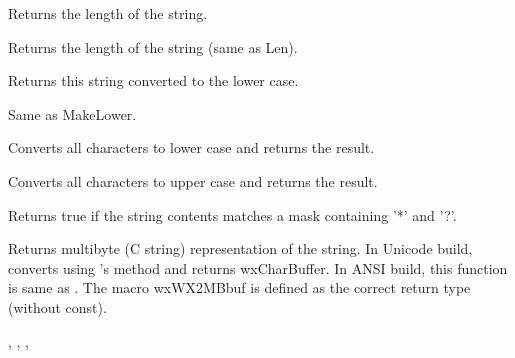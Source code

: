 \label{wxstringlen}


Returns the length of the string.

\label{wxstringlength}


Returns the length of the string (same as Len).

\label{wxstringlower}


Returns this string converted to the lower case.

\label{wxstringlowercase}


Same as MakeLower.

\label{wxstringmakelower}


Converts all characters to lower case and returns the result.

\label{wxstringmakeupper}


Converts all characters to upper case and returns the result.

\label{wxstringmatches}


Returns true if the string contents matches a mask containing '*' and '?'.

\label{wxstringmbstr}



Returns multibyte (C string) representation of the string.
In Unicode build, converts using 's 
method and returns wxCharBuffer. In ANSI build, this function is same
as .
The macro wxWX2MBbuf is defined as the correct return type (without const).


,
, ,

